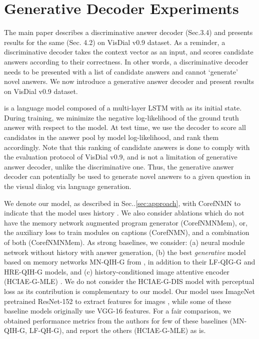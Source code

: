 \documentclass[runningheads]{llncs}
\makeatletter
\DeclareRobustCommand\onedot{\futurelet\@let@token\@onedot}
\def\@onedot{\ifx\@let@token.\else.\null\fi\xspace}
\def\Sec{Sec\onedot}
\newcommand{\nmn}{CorefNMN\xspace}
\newcommand{\myparagraph}[1]{\vspace{0pt}\noindent{\bf #1}}
\makeatother
\begin{document}
\section{Generative Decoder Experiments}
\label{sup:gen_results}

The main paper describes a discriminative answer decoder (Sec.3.4) and presents results for the same (Sec. 4.2) on VisDial v0.9 dataset.
As a reminder, a discriminative decoder takes the context vector  as an input, and scores candidate answers according to their correctness.
In other words, a discriminative decoder needs to be presented with a list of
candidate answers and cannot `generate' novel answers.
We now introduce a generative answer decoder and present results on VisDial 
v0.9 dataset.

\myparagraph{Generative Answer Decoder} is a language model composed of a 
multi-layer LSTM with  as its initial state. During training, we minimize
the negative log-likelihood  of the ground truth answer
 with respect to the model.
At test time, we use the decoder to score all candidates in the answer pool 
 by model log-likelihood, and rank them accordingly.
Note that this ranking of candidate answers is done to comply with the 
evaluation protocol of VisDial v0.9, and is not a limitation of generative
answer decoder, unlike the discriminative one.
Thus, the generative answer decoder can potentially be used to generate novel
answers to a given question in the visual dialog via language generation.

\myparagraph{Models and baselines.}
We denote our model, as described in \Sec\ref{sec:approach}, with
\nmn to indicate that the model uses history .
We also consider ablations which do not have the memory network augmented
program generator (\nmn{}Mem), or, the auxiliary loss 
 to train modules on captions 
(\nmn{}), and a combination of both
(\nmn{}Mem).
As strong baselines,
we consider: 
(a) neural module network without history \cite{hu2017learning} with answer generation,
(b) the best \textit{generative} model based on memory networks MN-QIH-G from 
\cite{visdial}, in addition to their LF-QIG-G and HRE-QIH-G models, and
(c) history-conditioned image attentive encoder (HCIAE-G-MLE) \cite{lu2017best}.
We do not consider the HCIAE-G-DIS model with perceptual loss \cite{lu2017best}
as its contribution is complementary to our model.
Our model uses  ImageNet pretrained ResNet-152 
 \cite{he16cvpr} to extract features for images , while
some of these baseline models originally use VGG-16 \cite{simonyan_iclr15}
features.
For a fair comparison, we obtained performance metrics from the authors for few
of these baselines (MN-QIH-G, LF-QH-G), and report the others (HCIAE-G-MLE) as 
is.
\end{document}
